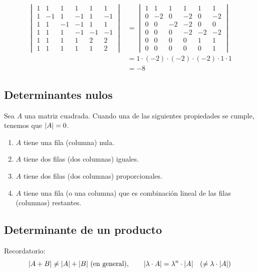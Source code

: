 \documentclass[11pt,a4paper]{article}
\begin{document}
\begin{ejemplo}
\begin{align*}
\begin{vmatrix}
1&1&1&1&1&1\\
1&-1&1&-1&1&-1\\
1&1&-1&-1&1&1\\
1&1&1&-1&-1&-1\\
1&1&1&1&2&2\\
1&1&1&1&1&2
\end{vmatrix}
&=
\begin{vmatrix}
1&1&1&1&1&1\\
0&-2&0&-2&0&-2\\
0&0&-2&-2&0&0\\
0&0&0&-2&-2&-2\\
0&0&0&0&1&1\\
0&0&0&0&0&1
\end{vmatrix}\\
&=1\cdot(-2)\cdot(-2)\cdot(-2)\cdot1\cdot1\\
&=-8
\end{align*}
\end{ejemplo}

\subsection{Determinantes nulos}

\begin{proposicion}
Sea $A$ una matriz cuadrada. Cuando una de las siguientes propiedades se cumple, tenemos que $\lvert A\rvert=0$.
\begin{enumerate}[label=\arabic*)]
  \item $A$ tiene una fila (columna) nula.
  \item $A$ tiene dos filas (dos columnas) iguales.
  \item $A$ tiene dos filas (dos columnas) proporcionales.
  \item $A$ tiene una fila (o una columna) que es combinación lineal de las filas (columnas) restantes.
\end{enumerate}
\end{proposicion}

\subsection{Determinante de un producto}

Recordatorio:
\[
\lvert A+B\rvert\neq\lvert A\rvert+\lvert B\rvert\ \text{(en general)},\qquad
\lvert\lambda\cdot A\rvert=\lambda^n\cdot\lvert A\rvert\quad(\neq\lambda\cdot\lvert A\rvert)
\]
\end{document}
